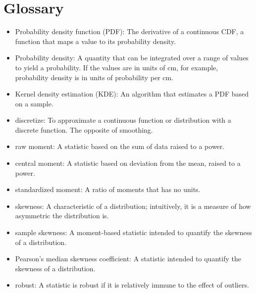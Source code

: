 \documentclass[12pt]{book}
\begin{document}
\section{Glossary}

\begin{itemize}

\item Probability density function (PDF): The derivative of a continuous CDF,
a function that maps a value to its probability density.

\item Probability density: A quantity that can be integrated over a
  range of values to yield a probability.  If the values are in units
  of cm, for example, probability density is in units of probability
  per cm.

\item Kernel density estimation (KDE): An algorithm that estimates a PDF
based on a sample.

\item discretize: To approximate a continuous function or distribution
with a discrete function.  The opposite of smoothing.

\item raw moment: A statistic based on the sum of data raised to a power.

\item central moment: A statistic based on deviation from the mean,
raised to a power.

\item standardized moment: A ratio of moments that has no units.

\item skewness: A characteristic of a distribution; intuitively, it
is a measure of how asymmetric the distribution is.

\item sample skewness: A moment-based statistic intended to quantify
the skewness of a distribution.

\item Pearson's median skewness coefficient: A statistic intended to
  quantify the skewness of a distribution.  

\item robust: A statistic is robust if it is relatively immune to the
  effect of outliers.

\end{itemize}
\end{document}
